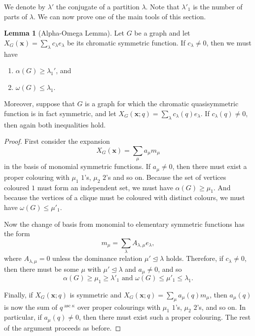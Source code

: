\documentclass[12pt]{amsart}  %
\theoremstyle{definition}
\newtheorem{lemma}[theorem]{Lemma}
\theoremstyle{remark}
\numberwithin{equation}{section}
\DeclareMathOperator{\asc}{asc}
\begin{document}
We denote by $\lambda'$ the conjugate of a partition $\lambda$. Note that $\lambda'_1$ is the number of parts of $\lambda$. We can now prove one of the main tools of this section.

\begin{lemma}[Alpha-Omega Lemma]
\label{lem:alphaomega} Let $G$ be a graph and let $X_G(\bm x)=\sum_\lambda c_\lambda e_\lambda$ be its chromatic symmetric function. If $c_\lambda\neq 0$, then we must have

\begin{enumerate}
    \item $\alpha(G) \geq \lambda_1'$, and
    \item $\omega(G)\leq \lambda_1$.
\end{enumerate}

Moreover, suppose that $G$ is a graph for which the chromatic quasisymmetric function is in fact symmetric, and let $X_G(\bm x;q)=\sum_\lambda c_\lambda(q)e_\lambda$. If $c_\lambda(q)\neq 0$, then again both inequalities hold.
\end{lemma}

\begin{proof}
First consider the expansion 
$$
X_G(\bm x)=\sum_\mu a_\mu m_\mu
$$
in the basis of monomial symmetric functions. If $a_\mu\neq 0$, then there must exist  a proper colouring with $\mu_1$ $1$'s, $\mu_2$ $2$'s and so on. Because the set of vertices coloured $1$ must form an independent set, we must have $\alpha(G)\geq\mu_1$. And because the vertices of a clique must be coloured with distinct colours, we must have $\omega(G)\leq\mu'_1$. 

Now the change of basis from monomial to elementary symmetric functions has the form
\begin{equation}
m_\mu=\sum_\lambda A_{\lambda,\mu}e_\lambda,
\end{equation}
where $A_{\lambda,\mu}=0$ unless the dominance relation $\mu'\unlhd\lambda$ holds. Therefore, if $c_\lambda\neq 0$, then there must be some $\mu$ with $\mu'\unlhd\lambda$ and $a_\mu\neq 0$, and so
\begin{equation}
\alpha(G)\geq\mu_1\geq\lambda'_1\text{ and }\omega(G)\leq\mu'_1\leq\lambda_1.
\end{equation}

Finally, if $X_G(\bm x;q)$ is symmetric and $X_G(\bm x;q)=\sum_\mu a_\mu(q)m_\mu$, then $a_\mu(q)$ is now the sum of $q^{\asc \kappa}$ over proper colourings with $\mu_1$ $1$'s, $\mu_2$ $2$'s, and so on. In particular, if $a_\mu(q)\neq 0$, then there must exist such a proper colouring. The rest of the argument proceeds as before. 
\end{proof}
\end{document}
